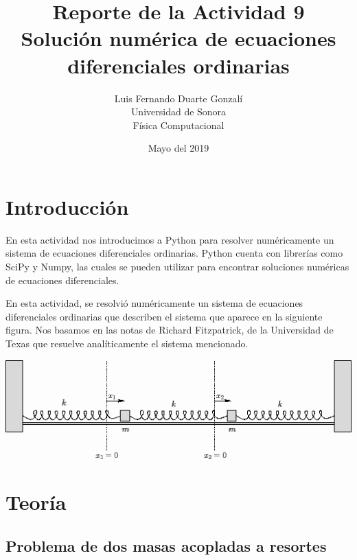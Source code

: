 \documentclass{article}
\title{\textbf{Reporte de la Actividad 9}\\ Solución numérica de ecuaciones diferenciales ordinarias}
\author{Luis Fernando Duarte Gonzalí \\ Universidad de Sonora \\ Física Computacional}
\date{Mayo del 2019}
\begin{document}
\maketitle


\section{Introducción}

En esta actividad nos introducimos a Python para resolver numéricamente un sistema de ecuaciones diferenciales ordinarias. Python cuenta con librerías como SciPy y Numpy, las cuales se pueden utilizar para encontrar soluciones numéricas de ecuaciones diferenciales.

En esta actividad, se resolvió numéricamente un sistema de ecuaciones diferenciales ordinarias que describen el sistema que aparece en la siguiente figura. Nos basamos en las notas de Richard Fitzpatrick, de la Universidad de Texas que resuelve analíticamente el sistema mencionado.

\begin{center}
    \includegraphics[scale = 0.5]{springs.png}
\end{center}

\section{Teoría}
\subsection{Problema de dos masas acopladas a resortes}
\end{document}
